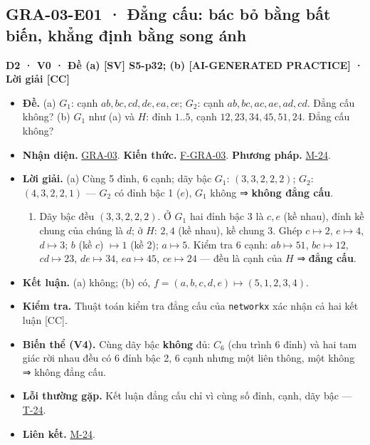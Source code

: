 \documentclass[
  10pt,
  twoside,openany]{book}
\providecommand{\tightlist}{%
  \setlength{\itemsep}{0pt}\setlength{\parskip}{0pt}}
\begin{document}
\hypertarget{GRA-03-E01}{%
\subsection{GRA-03-E01 · Đẳng cấu: bác bỏ bằng bất biến, khẳng định bằng
song ánh}\label{GRA-03-E01}}

\textbf{D2 · V0 · Đề (a) {[}SV{]} S5-p32; (b) {[}AI-GENERATED
PRACTICE{]} · Lời giải {[}CC{]}}

\begin{itemize}
\tightlist
\item
  \textbf{Đề.} (a) \(G_1\): cạnh \(ab,bc,cd,de,ea,ce\); \(G_2\): cạnh
  \(ab,bc,ac,ae,ad,cd\). Đẳng cấu không? (b) \(G_1\) như (a) và \(H\):
  đỉnh \(1..5\), cạnh \(12,23,34,45,51,24\). Đẳng cấu không?
\item
  \textbf{Nhận diện.} \protect\hyperlink{GRA-03}{GRA-03}. \textbf{Kiến
  thức.} \protect\hyperlink{F-GRA-03}{F-GRA-03}. \textbf{Phương pháp.}
  \protect\hyperlink{M-24}{M-24}.
\item
  \textbf{Lời giải.} (a) Cùng 5 đỉnh, 6 cạnh; dãy bậc \(G_1\):
  \((3,3,2,2,2)\); \(G_2\): \((4,3,2,2,1)\) --- \(G_2\) có đỉnh bậc 1
  (\(e\)), \(G_1\) không ⇒ \textbf{không đẳng cấu}.

  \begin{enumerate}
  \def\labelenumi{(\alph{enumi})}
  \setcounter{enumi}{1}
  \tightlist
  \item
    Dãy bậc đều \((3,3,2,2,2)\). Ở \(G_1\) hai đỉnh bậc 3 là \(c,e\) (kề
    nhau), đỉnh kề chung của chúng là \(d\); ở \(H\): \(2,4\) (kề nhau),
    kề chung \(3\). Ghép \(c\mapsto2\), \(e\mapsto4\), \(d\mapsto3\);
    \(b\) (kề \(c\)) \(\mapsto1\) (kề 2); \(a\mapsto5\). Kiểm tra 6
    cạnh: \(ab\mapsto51\), \(bc\mapsto12\), \(cd\mapsto23\),
    \(de\mapsto34\), \(ea\mapsto45\), \(ce\mapsto24\) --- đều là cạnh
    của \(H\) ⇒ \textbf{đẳng cấu}.
  \end{enumerate}
\item
  \textbf{Kết luận.} (a) không; (b) có,
  \(f=(a,b,c,d,e)\mapsto(5,1,2,3,4)\).
\item
  \textbf{Kiểm tra.} Thuật toán kiểm tra đẳng cấu của \texttt{networkx}
  xác nhận cả hai kết luận {[}CC{]}.
\item
  \textbf{Biến thể (V4).} Cùng dãy bậc \textbf{không} đủ: \(C_6\) (chu
  trình 6 đỉnh) và hai tam giác rời nhau đều có 6 đỉnh bậc 2, 6 cạnh
  nhưng một liên thông, một không ⇒ không đẳng cấu.
\item
  \textbf{Lỗi thường gặp.} Kết luận đẳng cấu chỉ vì cùng số đỉnh, cạnh,
  dãy bậc --- \protect\hyperlink{T-24}{T-24}.
\item
  \textbf{Liên kết.} \protect\hyperlink{M-24}{M-24}.
\end{itemize}
\end{document}
